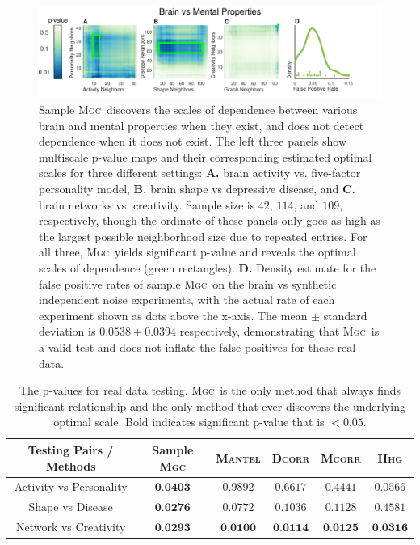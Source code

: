 \documentclass[11pt]{article}
\providecommand{\sct}[1]{{\normalfont\textsc{#1}}}
\newcommand{\Mgc}{\sct{Mgc}}
\newcommand{\Hhg}{\sct{Hhg}}
\newcommand{\Dcorr}{\sct{Dcorr}}
\newcommand{\Mcorr}{\sct{Mcorr}}
\newcommand{\Mantel}{\sct{Mantel}}
\begin{document}
\begin{figure}[htbp]
\includegraphics[width=1.0\textwidth]{Figures/FigReal}
\caption{Sample \Mgc~discovers the scales of dependence between various brain and mental properties when they exist, and does not detect dependence when it does not exist.  The left three panels show multiscale p-value maps and their corresponding estimated optimal scales for three different settings: \textbf{A.}  brain activity vs. five-factor personality model, \textbf{B.}  brain shape vs depressive disease, and \textbf{C.} brain networks vs. creativity. Sample size is $42$, $114$, and $109$, respectively, though the ordinate of these panels only goes as high as the largest possible neighborhood size due to repeated entries.  
For all three, \Mgc~yields significant p-value and reveals the optimal scales of dependence (green rectangles).
\textbf{D.} Density estimate for the false positive rates of sample \Mgc~on the brain vs synthetic independent noise experiments, with the actual rate of each experiment shown as dots above the x-axis. The mean $\pm$ standard deviation is $0.0538 \pm 0.0394$ respectively, demonstrating that \Mgc~is a valid test and does not inflate the false positives for these real data.}
\label{f:real}
\end{figure}

\begin{table}[htbp]
\centering
\begin{tabular}{|c||c|c|c|c|c|}
\hline
Testing Pairs / Methods & Sample \Mgc & \Mantel & \Dcorr & \Mcorr & \Hhg \\
\hline
Activity vs Personality & $\textbf{0.0403}$  & $0.9892$ & $0.6617$ & $0.4441$ & $0.0566$ \\
\hline
Shape vs Disease & $\textbf{0.0276}$  & $0.0772$ & $0.1036$ & $0.1128$ & $0.4581$ \\
\hline
Network vs Creativity & $\textbf{0.0293}$  & $\textbf{0.0100}$ & $\textbf{0.0114}$ & $\textbf{0.0125}$ & $\textbf{0.0316}$ \\
\hline
\end{tabular}
\caption{The p-values for real data testing. \Mgc~is the only method that always finds significant relationship and the only method that ever discovers the underlying optimal scale. Bold indicates significant p-value that is $<0.05$.}
\label{t:real}%
\end{table}
\end{document}
